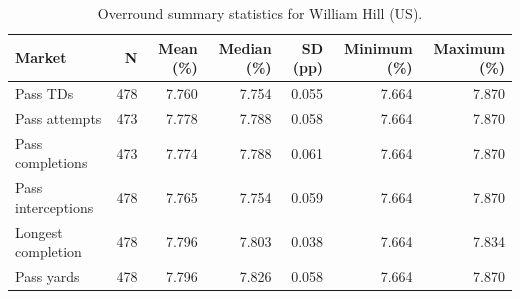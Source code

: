 \begin{table}
\caption{Overround summary statistics for William Hill (US).}
\label{tab:overround_william_hill_us}
\begin{tabular}{lrrrrrr}
\toprule
Market & N & Mean (\%) & Median (\%) & SD (pp) & Minimum (\%) & Maximum (\%) \\
\midrule
Pass TDs & 478 & 7.760 & 7.754 & 0.055 & 7.664 & 7.870 \\
Pass attempts & 473 & 7.778 & 7.788 & 0.058 & 7.664 & 7.870 \\
Pass completions & 473 & 7.774 & 7.788 & 0.061 & 7.664 & 7.870 \\
Pass interceptions & 478 & 7.765 & 7.754 & 0.059 & 7.664 & 7.870 \\
Longest completion & 478 & 7.796 & 7.803 & 0.038 & 7.664 & 7.834 \\
Pass yards & 478 & 7.796 & 7.826 & 0.058 & 7.664 & 7.870 \\
\bottomrule
\end{tabular}
\end{table}
